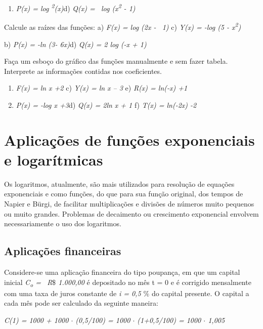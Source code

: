 \begin{exercicios}
\begin{enumerate}
	    \item \textit{P(x) = log \textsuperscript{2}(x)\quad \quad \quad }d) \textit{Q(x) =~ log (x\textsuperscript{2} - 1)}
    \end{enumerate}

    \exitem{} Calcule as raízes das funções:
    a) \textit{F(x) = log (2x -~ 1) \quad }\quad c) \textit{Y(x) = -log (5 - x\textsuperscript{2})}

    b) \textit{P(x) = -ln (3- 6x)\quad \quad }\quad d) \textit{Q(x) = 2 log (-x + 1)}

    \item Faça um esboço do gráfico das funções manualmente e sem fazer tabela. Interprete as informações contidas nos coeficientes.
    \begin{enumerate}
    	\item \textit{F(x) = ln x +2} \quad \quad c) \textit{Y(x) = ln x – 3 \quad }e)\textit{ R(x) = ln(-x) +1}

	    \item \textit{P(x) = -log x +3\quad }\quad d) \textit{Q(x) = 2ln x + 1 \quad }f)\textit{ T(x) = ln(-2x) -2} 
    \end{enumerate}
\end{exercicios}

\section{Aplicações de funções exponenciais e logarítmicas}

Os logaritmos, atualmente, são mais utilizados para resolução de equações exponenciais e como funções, do que para sua função original, dos tempos de Napier e Bürgi, de facilitar multiplicações e divisões de números muito pequenos ou muito grandes. Problemas de decaimento ou crescimento exponencial envolvem necessariamente o uso dos logaritmos.

\subsection{Aplicações financeiras}

Considere-se uma aplicação financeira do tipo poupança, em que um capital inicial \textit{C\textsubscript{o }=~ R$\$$  1.000,00} é depositado no mês t = 0 e é corrigido mensalmente com uma taxa de juros constante de \textit{i = 0,5 $\%$ } do capital presente. O capital a cada mês pode ser calculado da seguinte maneira:

\textit{C(1) = 1000 + 1000 $ \cdot $  (0,5/100) = 1000 $ \cdot $  (1+0,5/100) = 1000 $ \cdot $  1,005}

